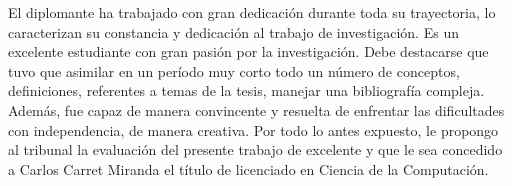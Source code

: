 \begin{opinion}
El diplomante ha trabajado con gran dedicación durante toda su trayectoria, lo caracterizan su constancia y dedicación al trabajo de investigación. Es un excelente estudiante con gran pasión por la investigación. Debe destacarse que tuvo que asimilar en un período muy corto todo un número de conceptos, definiciones, referentes a temas de la tesis, manejar una bibliografía compleja. Además, fue capaz de manera convincente y resuelta de enfrentar las dificultades con independencia, de manera creativa.
Por todo lo antes expuesto, le propongo al tribunal la evaluación del presente trabajo de excelente y que le sea concedido a Carlos Carret Miranda el título de licenciado en Ciencia de la Computación.
\end{opinion}